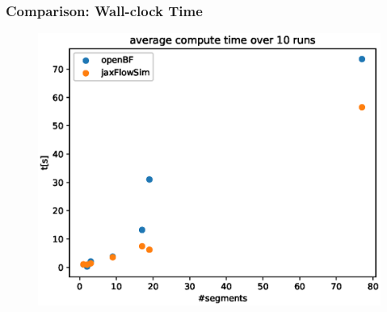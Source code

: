 \documentclass[compress]{beamer}
\begin{document}
\begin{frame}
	\frametitle{Comparison: Wall-clock Time}
	\begin{figure} [H]
		\centering
		\includegraphics[width=0.94\columnwidth]{../figures/timing_benchmark.eps}
		\label{fig:comparison}
	\end{figure}

\end{frame}
\end{document}
